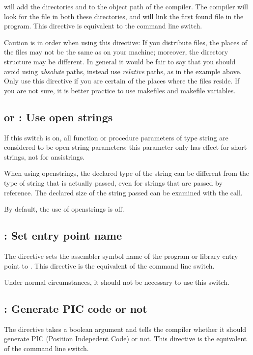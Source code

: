will add the directories  and  to the
object path of the compiler. The compiler will look for the file 
in both these directories, and will link the first found file in the
program. This directive is equivalent to the  command line switch.

Caution is in order when using this directive: If you distribute files, the
places of the files may not be the same as on your machine; moreover, the
directory structure may be different. In general it would be fair to say
that you should avoid using {\em absolute} paths, instead use {\em relative}
paths, as in the example above. Only use this directive if you are certain
of the places where the files reside. If you are not sure, it is better
practice to use makefiles and makefile variables.

\subsection{ or  : Use open strings}

If this switch is on, all function or procedure parameters of type string
are considered to be open string parameters; this parameter only has effect
for short strings, not for ansistrings.

When using openstrings, the declared type of the string can be different
from the type of string that is actually passed, even for strings that are
passed by reference. The declared size of the string passed can be examined
with the  call.

By default, the use of openstrings is off.

\subsection{ : Set entry point name}
\label{se:Pascalmainname}
The  directive sets the assembler
symbol name of the program or library entry point to .
This directive is the equivalent of the  command line switch.

Under normal circumstances, it should not be necessary to use this
switch.

\subsection{ : Generate PIC code or not}
\label{se:Pic}
The  directive takes a boolean argument and tells the
compiler whether it should generate PIC (Position Indepedent Code) or not.
This directive is the equivalent of the  command line switch.


